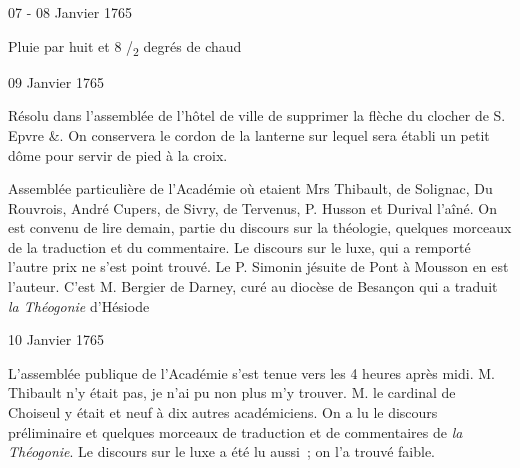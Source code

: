                      \begin{diary}{07 - 08 Janvier 1765}{}
                        
                           
                        
                        
                           Pluie par huit et 8 /\textsubscript{2} degrés de chaud
                        \bigskip
        
        
                     \end{diary}
                     \begin{diary}{09 Janvier 1765}{}
                        
                         Résolu dans l'assemblée de
                              l'hôtel de ville de supprimer
                           la flèche du clocher de S.
                              Epvre &. On conservera
                           le cordon de la lanterne sur lequel sera établi un
                           petit dôme pour servir de pied à la croix. \bigskip
        
        
                         Assemblée particulière de l'Académie où etaient
                           Mrs Thibault, de Solignac, Du
                              Rouvrois, André
                           Cupers, de
                              Sivry,
                              de Tervenus, P. Husson et Durival
                              l'aîné. On est convenu de lire demain, partie
                           du discours sur la théologie,
                           quelques morceaux
                           de la traduction et du commentaire. Le
                                 discours sur le
                              luxe, qui a remporté l'autre
                           prix ne s'est point trouvé. Le P.
                              Simonin
                           jésuite de
                           Pont à Mousson en est
                           l'auteur. C'est M. Bergier
                           de Darney, curé au diocèse de
                              Besançon qui
                           a traduit \emph{la Théogonie} d'Hésiode
                        \bigskip
        
        
                     \end{diary}
                     \begin{diary}{10 Janvier 1765}{}
                        
                         L'assemblée publique de l'Académie s'est tenue
                           vers les 4 heures après midi. M.
                              Thibault n'y
                           était pas, je n'ai pu non plus m'y trouver. M.
                              le cardinal de Choiseul y était et neuf à
                           dix autres académiciens. On a lu le discours
                           préliminaire et quelques morceaux de traduction
                           et de commentaires de \emph{la Théogonie}. Le discours
                              sur le luxe a été lu aussi ; on l'a trouvé faible. \bigskip
        
        
                     \end{diary}

